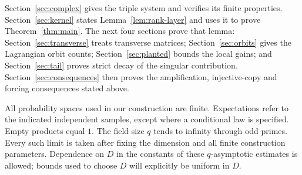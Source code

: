 Section~\ref{sec:complex} gives the triple system and verifies its
finite properties. Section~\ref{sec:kernel} states
Lemma~\ref{lem:rank-layer} and uses it to prove
Theorem~\ref{thm:main}. The next four sections prove that lemma:
Section~\ref{sec:transverse} treats transverse matrices;
Section~\ref{sec:orbits} gives the Lagrangian orbit counts;
Section~\ref{sec:planted} bounds the local gains; and
Section~\ref{sec:tail} proves strict decay of the singular
contribution. Section~\ref{sec:consequences} then proves the amplification,
injective-copy and forcing consequences stated above.

All probability spaces used in our construction are finite. Expectations
refer to the indicated independent samples, except where a
conditional law is specified. Empty products equal \(1\).
The field size \(q\) tends to infinity through odd primes. Every
such limit is taken after fixing the dimension and all finite
construction parameters. Dependence on \(D\) in the constants of
these \(q\)-asymptotic estimates is allowed; bounds used to choose
\(D\) will explicitly be uniform in \(D\).

